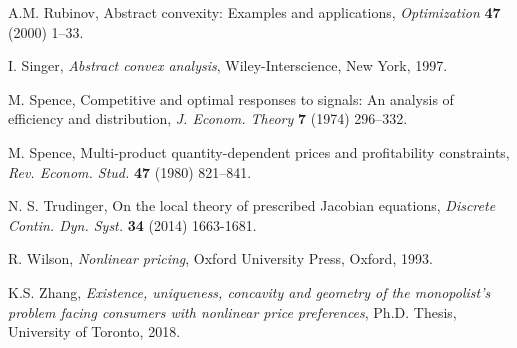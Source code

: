 \documentclass[a4paper, 11pt]{amsart}
\numberwithin{equation}{section}
\theoremstyle{plain}
\theoremstyle{definition}
\theoremstyle{remark}
\begin{document}
\begin{thebibliography}{BCDE}
{	 
	A.M. Rubinov, 
	Abstract convexity: Examples and applications, 
	{\em Optimization} {\bf 47} (2000)  1–33. 
}

{ 
	I. Singer, 
	{\em Abstract convex analysis}, Wiley-Interscience, New York, 1997.
}

	M. Spence, 
	Competitive and optimal responses to signals: An analysis of efficiency and distribution, 
	{\em J. Econom. Theory} {\bf 7} (1974) 296–332.

	M. Spence, 
	Multi-product quantity-dependent prices and profitability constraints, 
	{\em Rev. Econom. Stud.} {\bf 47} (1980) 821–841.
	
	N. S. Trudinger, 
	On the local theory of prescribed Jacobian equations, 
	{\em Discrete Contin. Dyn. Syst.} {\bf 34} (2014) 1663-1681.



	R. Wilson, 
	{\em Nonlinear pricing}, 
	Oxford University Press, Oxford, 1993.

	K.S. Zhang,
	{\em Existence, uniqueness, concavity and geometry of the monopolist’s
	problem facing consumers with nonlinear price preferences}, Ph.D. Thesis, University of Toronto, 2018.
	
	
\end{thebibliography}


\bigskip
\end{document}
